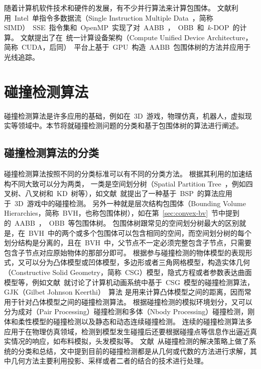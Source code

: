 随着计算机软件技术和硬件的发展，有不少并行算法来计算包围体。
文献利用~Intel~单指令多数据流（Single Instruction
Multiple Data~，简称SIMD）~SSE~指令集和~OpenMP~实现了对~AABB~，~OBB~和~$k$-DOP~的计算。
文献提出了在~统一计算设备架构（Compute Unified Device
Architecture，简称~CUDA，后同）~平台上基于~GPU~构造~AABB~包围体树的方法并应用于光线追踪。

\section{碰撞检测算法}
\label{sec:collisiondetection}

碰撞检测算法是许多应用的基础，例如在~3D~游戏，物理仿真，机器人，虚拟现实等领域中。本节将就碰撞检测问题的分类和基于包围体树的算法进行阐述。

\subsection{碰撞检测算法的分类}
\label{sec:cd-category}

碰撞检测算法按照不同的分类标准可以有不同的分类方法。
根据其利用的加速结构不同大致可以分为两类，
一类是空间划分树（Spatial Partition Tree~，例如四叉树、八叉树和~KD~树等），如文献~就提出了一种基于~BSP~的算法应用于~3D~游戏中的碰撞检测。
另外一种就是层次结构包围体（Bounding Volume Hierarchies，简称~BVH，也称包围体树），如在第~\ref{sec:convex-bv}~节中提到的~AABB~，~OBB~等包围体树。
包围体树跟常见的空间划分树最大的区别就是，在~BVH~中的两个或多个包围体可以包含相同的空间，而空间划分树的每个划分结构是分离的，且在~BVH~中，父节点不一定必须完整包含子节点，只需要包含子节点对应原始物体的那部分即可\cite{ericson2005real}。 
根据参与碰撞检测的物体模型的表现形式，又可以分为凸体模型或凹体模型，多边形或者三角网格模型，构造实体几何（Constructive
Solid Geometry，简称~CSG）模型，隐式方程或者参数表达曲面模型等，例如文献~就讨论了计算机动画系统中基于~CSG~模型的碰撞检测算法，GJK（Gilbet Johnson Keerthi）~算法\cite{gilbert1988fast,bergen1999fast}
是用来计算凸体模型之间的距离，因而常用于针对凸体模型之间的碰撞检测算法。
根据碰撞检测的模拟环境划分，又可以分为成对（Pair Processing）碰撞检测和多体（Nbody Processing）碰撞检测，刚体和柔性模型的碰撞检测以及静态和动态连续碰撞检测\cite{lin1998collision}。
连续的碰撞检测算法多应用于在物理仿真领域，检测到模型发生碰撞后还要根据碰撞点等信息作出逼近真实情况的响应，如布料模拟\cite{Brochu2012,Wang2014}，头发模拟\cite{Kaufman2014,Chai2014}等。
文献~从碰撞检测的解决策略上做了系统的分类和总结，文中提到目前的碰撞检测都是从几何或代数的方法进行求解，其中几何方法主要利用投影、采样或者二者的结合的技术进行处理。

